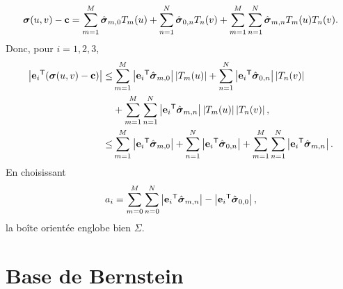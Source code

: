 \begin{equation}
	\boldsymbol{\sigma}(u,v) - \mathbf{c} =
	\sum_{m=1}^{M} \hat{\boldsymbol{\sigma}}_{m,0} T_m(u) +
	\sum_{n=1}^{N} \hat{\boldsymbol{\sigma}}_{0,n} T_n(v) + 
	\sum_{m=1}^{M} \sum_{n=1}^{N} \hat{\boldsymbol{\sigma}}_{m,n} T_m(u) T_n(v).
\end{equation}
Donc, pour $i = 1,2,3$,
\begin{align}
	\left| {\mathbf{e}_i} ^\mathsf{T} {\left( \boldsymbol{\sigma}(u,v) - \mathbf{c} \right)} \right| \leq &
	\sum_{m=1}^{M} \left| {\mathbf{e}_i} ^\mathsf{T} {\hat{\boldsymbol{\sigma}}_{m,0}} \right| \left| T_m(u) \right| + 
	\sum_{n=1}^{N} \left| {\mathbf{e}_i} ^\mathsf{T} {\hat{\boldsymbol{\sigma}}_{0,n}} \right| \left| T_n(v) \right| \nonumber \\
	&+ \sum_{m=1}^{M} \sum_{n=1}^{N} \left| {\mathbf{e}_i} ^\mathsf{T} {\hat{\boldsymbol{\sigma}}_{m,n}} \right| \left| T_m(u) \right| \left| T_n(v) \right| ,\nonumber \\
	\leq &
	\sum_{m=1}^{M} \left| {\mathbf{e}_i} ^\mathsf{T} {\hat{\boldsymbol{\sigma}}_{m,0}} \right| + 
	\sum_{n=1}^{N} \left| {\mathbf{e}_i} ^\mathsf{T} {\hat{\boldsymbol{\sigma}}_{0,n}} \right| + 
	\sum_{m=1}^{M} \sum_{n=1}^{N} \left| {\mathbf{e}_i} ^\mathsf{T} {\hat{\boldsymbol{\sigma}}_{m,n}} \right|.
\end{align}
En choisissant
\begin{equation}
	a_i = 
	\sum_{m=0}^{M} \sum_{n=0}^{N} \left| {\mathbf{e}_i} ^\mathsf{T} {\hat{\boldsymbol{\sigma}}_{m,n}} \right|
	- \left| {\mathbf{e}_i} ^\mathsf{T} {\hat{\boldsymbol{\sigma}}_{0,0}} \right|, 
\end{equation}
la boîte orientée englobe bien $\Sigma$.
%
%
%
\section{Base de Bernstein}

